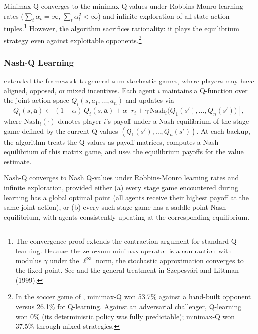 Minimax-Q converges to the minimax Q-values under Robbins-Monro learning rates ($\sum_t \alpha_t = \infty$, $\sum_t \alpha_t^2 < \infty$) and infinite exploration of all state-action tuples.\footnote{The convergence proof extends the contraction argument for standard Q-learning. Because the zero-sum minimax operator is a contraction with modulus $\gamma$ under the $\ell^\infty$ norm, the stochastic approximation converges to the fixed point. See \citet{littman1994markov} and the general treatment in Szepesvári and Littman (1999).} However, the algorithm sacrifices rationality: it plays the equilibrium strategy even against exploitable opponents.\footnote{In the soccer game of \citet{littman1994markov}, minimax-Q won 53.7\% against a hand-built opponent versus 26.1\% for Q-learning. Against an adversarial challenger, Q-learning won 0\% (its deterministic policy was fully predictable); minimax-Q won 37.5\% through mixed strategies.}

\subsubsection{Nash-Q Learning}

\citet{hu2003nash} extended the framework to general-sum stochastic games, where players may have aligned, opposed, or mixed incentives. Each agent $i$ maintains a Q-function over the joint action space $Q_i(s, a_1, \ldots, a_n)$ and updates via
\begin{equation}
Q_i(s, \mathbf{a}) \leftarrow (1-\alpha)\, Q_i(s, \mathbf{a}) + \alpha\left[r_i + \gamma\, \text{Nash}_i\bigl(Q_1(s'), \ldots, Q_n(s')\bigr)\right],
\label{eq:nash_q_update}
\end{equation}
where $\text{Nash}_i(\cdot)$ denotes player $i$'s payoff under a Nash equilibrium of the stage game defined by the current Q-values $(Q_1(s'), \ldots, Q_n(s'))$. At each backup, the algorithm treats the Q-values as payoff matrices, computes a Nash equilibrium of this matrix game, and uses the equilibrium payoffs for the value estimate.

\begin{theorem}
\label{thm:nash_q}
Nash-Q converges to Nash Q-values under Robbins-Monro learning rates and infinite exploration, provided either (a) every stage game encountered during learning has a global optimal point (all agents receive their highest payoff at the same joint action), or (b) every such stage game has a saddle-point Nash equilibrium, with agents consistently updating at the corresponding equilibrium.
\end{theorem}

